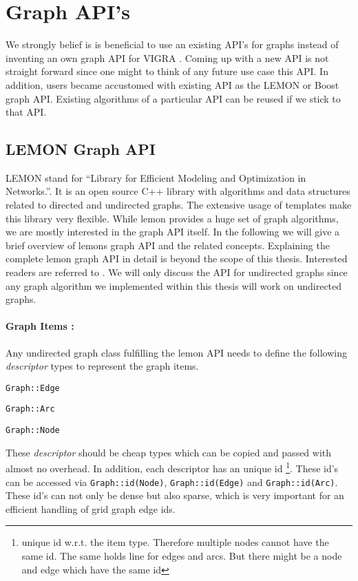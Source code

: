 
\section{Graph API's}\label{sec:graph_apis}



We strongly belief is is beneficial to use an existing API's for
graphs instead of inventing an own graph API for VIGRA \citep{software_vigra,koethe_2000_phd_thesis}.
Coming up with a new API is not straight forward
since one might to think of any future use case this API.
In addition, users became accustomed with existing API as 
the LEMON or Boost graph API.
Existing algorithms of a particular API can be reused if we stick
to that API.




\subsection{LEMON Graph API}\label{sec:lemon_graph_apis}
    LEMON \citet{ lemon_lib} 
    stand for  ``Library for Efficient Modeling and Optimization in Networks.''.
    It is an open source C++ library with algorithms and data structures 
    related to directed and undirected graphs.
    The extensive usage of templates make this library very flexible.
    While lemon provides a huge set of graph algorithms,
    we are mostly interested in the graph API itself.
    In the following we will give a brief overview of lemons graph 
    API and the related concepts.
    Explaining the complete lemon graph API in detail
    is beyond the scope of this thesis.
    Interested readers are referred to \citet{lemon_lib}.
    We will only discuss the API for undirected graphs since any
    graph algorithm we implemented within this thesis
    will work on undirected graphs.

\paragraph{Graph Items :}
    Any undirected graph class fulfilling the lemon API needs to define 
    the following \emph{descriptor} types to represent the graph items.
    \begin{compactitem}
    \item \lstinline{Graph::Edge}
    \item \lstinline{Graph::Arc}
    \item \lstinline{Graph::Node}
    \end{compactitem}
    These \emph{descriptor} should be cheap types which can be copied
    and passed with almost no overhead.
    In addition, each descriptor has an unique id
    \footnote{ unique id w.r.t. the item type. 
    Therefore  multiple  nodes cannot have the same id.
    The same holds line for edges and arcs.
    But there might be a node and edge which have the same id}.
    These id's can be accessed via \lstinline{Graph::id(Node)}, \lstinline{Graph::id(Edge)} and \lstinline{Graph::id(Arc)}.
    These id's can not only be dense but also sparse, which is very
    important for an efficient handling of grid graph edge ids.


